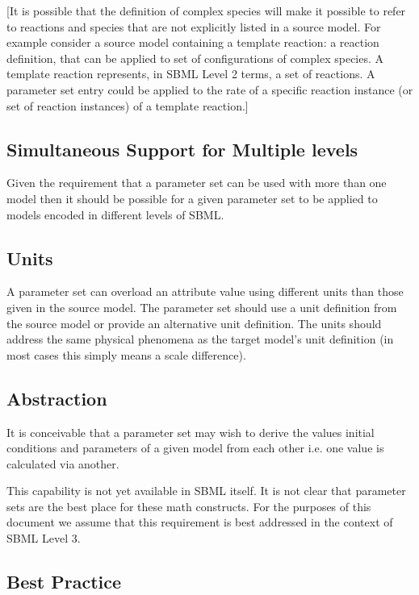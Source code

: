 \documentclass[10pt,twocolumntoc]{cekarticle}
\begin{document}
[It is possible that the definition of complex species will make it possible to refer to
reactions and species that are not explicitly listed in a source model.  For example consider a
source model containing a template reaction: a reaction definition, that can be applied to set
of configurations of complex species. A template reaction represents, in SBML Level 2 terms, a set
of reactions.  A parameter set entry could be applied to the rate of a specific reaction instance (or
set of reaction instances) of a template reaction.]

\subsection{Simultaneous Support for Multiple levels}

Given the requirement that a parameter set can be used with more than one model then it should be
possible for a given parameter set to be applied to models encoded in different levels of SBML.

\subsection{Units}

A parameter set can overload an attribute value using different units than those given
in the source model.  The parameter set should use a unit definition from the source model or
provide an alternative unit definition.  The units should address the same physical phenomena as
the target model's unit definition (in most cases this simply means a scale difference).

\subsection{Abstraction}

It is conceivable that a parameter set may wish to derive the values initial conditions and
parameters of a given model from each other i.e. one value is calculated via another.

This capability is not yet available in SBML itself.  It is not clear that parameter sets are
the best place for these math constructs.  For the purposes of this document we assume
that this requirement is best addressed in the context of SBML Level 3.

\subsection{Best Practice}
\end{document}

